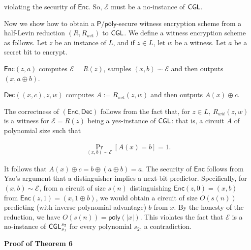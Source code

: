 violating the security of ${\mathsf{Enc}}$. So, $\mathcal{E}$ must be a no-instance of ${\sf CGL}$.\par




Now we show how to obtain a ${\mathsf{P}}/{\mathsf{poly}}$-secure witness encryption scheme from a half-Levin reduction $(R,R_{wit})$ to ${\sf CGL}$. We define a witness encryption scheme as follows. Let $z$ be an instance of $L$, and if $z\in L$, let $w$ be a witness. Let $a$ be a secret bit to encrypt.\par



${\mathsf{Enc}}(z,a)$ computes $\mathcal{E}=R(z)$, samples $(x,b)\sim\mathcal{E}$ and then outputs $(x,a\oplus b)$.\par




${\mathsf{Dec}}((x,c),z,w)$ computes $A:=R_{wit}(z,w)$ and then outputs $A(x)\oplus c$.\par



The correctness of $({\mathsf{Enc}},{\mathsf{Dec}})$ follows from the fact that, for $z\in L$, $R_{wit}(z,w)$ is a witness for $\mathcal{E}=R(z)$ being a yes-instance of ${\sf CGL}$: that is, a circuit $A$ of polynomial size such that\par


\[\begin{gathered}
\Pr_{(x,b)\sim\mathcal{E}}[A(x)=b]=1.
\end{gathered}\]


It follows that $A(x)\oplus c=b\oplus(a\oplus b)=a$. The security of ${\mathsf{Enc}}$ follows from Yao’s argument that a distinguisher implies a next-bit predictor. Specifically, for $(x,b)\sim\mathcal{E}$, from a circuit of size $s(n)$ distinguishing ${\mathsf{Enc}}(z,0)=(x,b)$ from ${\mathsf{Enc}}(z,1)=(x,1\oplus b)$, we would obtain a circuit of size $O(s(n))$ predicting (with inverse polynomial advantage) $b$ from $x$. By the honesty of the reduction, we have $O(s(n))={\mathsf{poly}}(|x|)$. This violates the fact that $\mathcal{E}$ is a no-instance of ${\sf CGL}_{s_{1}}^{s_{2}}$ for every polynomial $s_{2}$, a contradiction.\par





\par\medskip\noindent\textbf{Proof of Theorem 6
}\par




